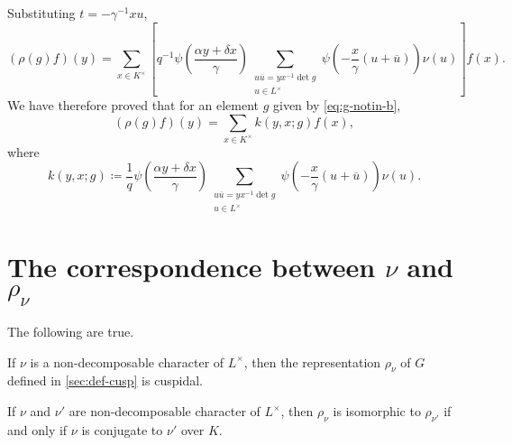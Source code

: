 \documentclass[../main.tex]{subfiles}
\begin{document}
Substituting $t=-\gamma^{-1}xu$,
\[(\rho(g)f)(y)=\sum_{x\in K^\times}\left[q^{-1}\psi\left(\frac{\alpha y+\delta x}\gamma\right)\sum_{\substack{u\overline u=yx^{-1}\det g\\u\in L^\times}}\psi\left(-\frac x\gamma(u+\overline u)\right)\nu(u)\right]f(x).\]
We have therefore proved that for an element $g$ given by \eqref{eq:g-notin-b},
\[(\rho(g)f)(y)=\sum_{x\in K^\times}k(y,x;g)f(x),\]
where
\[k(y,x;g)\coloneqq\frac1q\psi\left(\frac{\alpha y+\delta x}\gamma\right)\sum_{\substack{u\overline u=yx^{-1}\det g\\u\in L^\times}}\psi\left(-\frac x\gamma(u+\overline u)\right)\nu(u).\]

\section{The correspondence between \texorpdfstring{$\nu$}{ v} and \texorpdfstring{$\rho_\nu$}{ pv}} \label{sec:classify-cusp}
\begin{proposition} \label{prop:cusp-reps}
	The following are true.
	\begin{listalph}
		\item If $\nu$ is a non-decomposable character of $L^\times$, then the representation $\rho_\nu$ of $G$ defined in \cref{sec:def-cusp} is cuspidal.
		\item If $\nu$ and $\nu'$ are non-decomposable character of $L^\times$, then $\rho_\nu$ is isomorphic to $\rho_{\nu'}$ if and only if $\nu$ is conjugate to $\nu'$ over $K$.
	\end{listalph}
\end{proposition}
\end{document}
